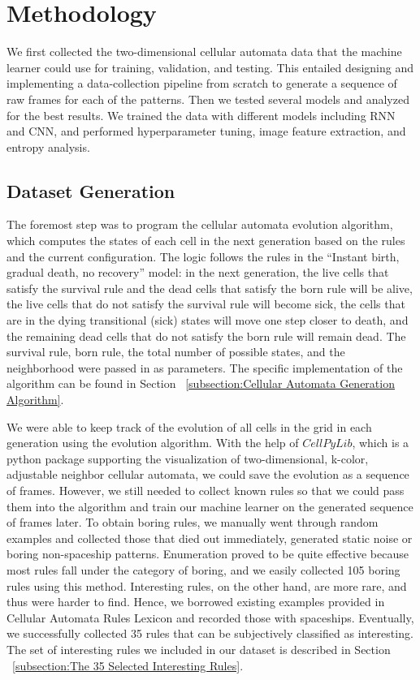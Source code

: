 \documentclass[12pt]{article}
\numberwithin{figure}{section} %
\begin{document}
\newpage
\section{Methodology}
\label{Methodology}
We first collected the two-dimensional cellular automata data that the machine learner could use for training, validation, and testing. This entailed designing and implementing a data-collection pipeline from scratch to generate a sequence of raw frames for each of the patterns. Then we tested several models and analyzed for the best results. We trained the data with different models including RNN and CNN, and performed hyperparameter tuning, image feature extraction, and entropy analysis. 

\subsection{Dataset Generation}
The foremost step was to program the cellular automata evolution algorithm, which computes the states of each cell in the next generation based on the rules and the current configuration. The logic follows the rules in the “Instant birth, gradual death, no recovery” model: in the next generation, the live cells that satisfy the survival rule and the dead cells that satisfy the born rule will be alive, the live cells that do not satisfy the survival rule will become sick, the cells that are in the dying transitional (sick) states will move one step closer to death, and the remaining dead cells that do not satisfy the born rule will remain dead. The survival rule, born rule, the total number of possible states, and the neighborhood were passed in as parameters. The specific implementation of the algorithm can be found in Section ~\ref{subsection:Cellular Automata Generation Algorithm}. 

We were able to keep track of the evolution of all cells in the grid in each generation using the evolution algorithm. With the help of $CellPyLib$, which is a python package supporting the visualization of two-dimensional, k-color, adjustable neighbor cellular automata, we could save the evolution as a sequence of frames. However, we still needed to collect known rules so that we could pass them into the algorithm and train our machine learner on the generated sequence of frames later. To obtain boring rules, we manually went through random examples and collected those that died out immediately, generated static noise or boring non-spaceship patterns. Enumeration proved to be quite effective because most rules fall under the category of boring, and we easily collected 105 boring rules using this method. Interesting rules, on the other hand, are more rare, and thus were harder to find. Hence, we borrowed existing examples provided in Cellular Automata Rules Lexicon and recorded those with spaceships. Eventually, we successfully collected 35 rules that can be subjectively classified as interesting. The set of interesting rules we included in our dataset is described in Section ~\ref{subsection:The 35 Selected Interesting Rules}. 
\end{document}
